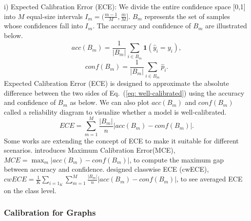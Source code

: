 i) Expected Calibration Error (ECE):
We divide the entire confidence space [0,1] into $M$ equal-size intervals $I_m = (\frac{m-1}{M},\frac{m}{M}]$. $B_m$ represents the set of samples whose confidences fall into $I_m$. The accuracy and confidence of $B_m$ are illustrated below.
\begin{equation}
    acc(B_m)=\frac{1}{|B_m|}\sum_{i\in B_m}\textbf{1}(\hat{y}_i=y_i),
\end{equation}
\begin{equation}
    conf(B_m)=\frac{1}{|B_m|}\sum_{i\in B_m}\hat{p}_i.
\end{equation}
Expected Calibration Error (ECE) is designed to approximate the absolute difference between the two sides of Eq.~(\ref{eq: well-calibrated}) using the accuracy and confidence of $B_m$ as below. We can also plot $acc(B_m)$ and $conf(B_m)$ called a reliability diagram to visualize whether a model is well-calibrated.
\begin{equation}
    ECE=\sum_{m=1}^M\frac{|B_m|}{n}|acc(B_m)-conf(B_m)|.
\end{equation}
Some works are extending the concept of ECE to make it suitable for different scenarios. \cite{naeini2015obtaining} introduces Maximum Calibration Error(MCE), $MCE=\max_m|acc(B_m)-conf(B_m)|$, to compute the maximum gap between accuracy and confidence. \cite{kull2019beyond} designed classwise ECE (cwECE), $cwECE=\frac{1}{K}\sum_{i=1}_K\sum_{m=1}^M\frac{|B_m|}{n}|acc(B_m)-conf(B_m)|$, to see averaged ECE on the class level.

\subsubsection{Calibration for Graphs}